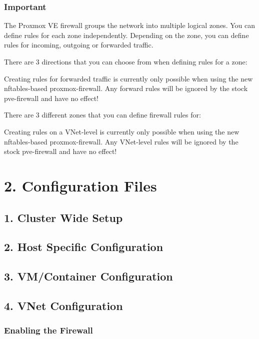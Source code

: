 \subsubsection{Important}

The Proxmox VE firewall groups the network into multiple logical zones. You can define rules for each zone independently. Depending on the zone, you can define rules for incoming, outgoing or forwarded traffic.

There are 3 directions that you can choose from when defining rules for a zone:

Creating rules for forwarded traffic is currently only possible when using the new nftables-based proxmox-firewall. Any forward rules will be ignored by the stock pve-firewall and have no effect!

There are 3 different zones that you can define firewall rules for:

Creating rules on a VNet-level is currently only possible when using the new nftables-based proxmox-firewall. Any VNet-level rules will be ignored by the stock pve-firewall and have no effect!


\section{2. Configuration Files}

\subsection{1. Cluster Wide Setup}

\subsection{2. Host Specific Configuration}

\subsection{3. VM/Container Configuration}

\subsection{4. VNet Configuration}

\subsubsection{Enabling the Firewall}

